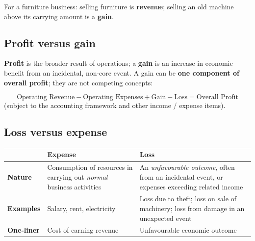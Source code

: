 \documentclass[11pt,a4paper]{article}
\begin{document}
For a furniture business: selling furniture is \textbf{revenue}; selling an old machine above its carrying amount is a
\textbf{gain}.

\subsection{Profit versus gain}

\textbf{Profit} is the broader result of operations; a \textbf{gain} is an increase in economic benefit from an
incidental, non-core event. A gain can be \textbf{one component of overall profit}; they are not competing concepts:

\[
\text{Operating Revenue}-\text{Operating Expenses}+\text{Gain}-\text{Loss}=\text{Overall Profit}
\]
(subject to the accounting framework and other income / expense items).

\subsection{Loss versus expense}

\begin{center}
\small
\begin{tabularx}{\textwidth}{@{}l Y Y@{}}
\toprule
{} & \textbf{Expense} & \textbf{Loss}\\
\midrule
\textbf{Nature} & Consumption of resources in carrying out \emph{normal} business activities & An \emph{unfavourable outcome}, often from an incidental event, or expenses exceeding related income\\
\textbf{Examples} & Salary, rent, electricity & Loss due to theft; loss on sale of machinery; loss from damage in an unexpected event\\
\textbf{One-liner} & Cost of earning revenue & Unfavourable economic outcome\\
\bottomrule
\end{tabularx}
\end{center}
\end{document}
